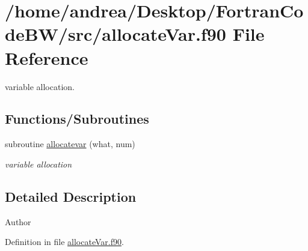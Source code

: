 \hypertarget{allocate_var_8f90}{\section{/home/andrea/\-Desktop/\-Fortran\-Code\-B\-W/src/allocate\-Var.f90 File Reference}
\label{allocate_var_8f90}
}


variable allocation.  


\subsection*{Functions/\-Subroutines}
\begin{DoxyCompactItemize}
\item 
subroutine \hyperlink{allocate_var_8f90_ab05eb79f2192fe599c8b251796a49963}{allocatevar} (what, num)
\begin{DoxyCompactList}\small\item\em variable allocation \end{DoxyCompactList}\end{DoxyCompactItemize}


\subsection{Detailed Description}
\begin{DoxyAuthor}{Author}

\end{DoxyAuthor}


Definition in file \hyperlink{allocate_var_8f90_source}{allocate\-Var.\-f90}.




